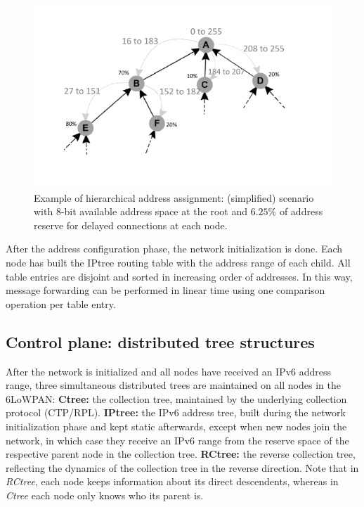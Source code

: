 \begin{figure}[ht]
    \centering
    \includegraphics[width=0.9\linewidth]{./Images/mhcl.pdf}
\caption{Example of hierarchical address assignment: (simplified)
scenario with 8-bit available address space at the root and $6.25\%$
of address reserve for delayed connections at each node.}
    \label{fig:mhcl}
\end{figure}

After the address configuration phase, the network initialization is done.
Each node has built the IPtree routing table with the address range of each
child. All table entries are disjoint and sorted in increasing order of
addresses. In this way, message forwarding can be performed in linear time using
one comparison operation per table entry.



\subsection{Control plane: distributed tree structures}

After the network is initialized and all nodes have received an IPv6
address range, three simultaneous distributed trees are maintained
on all nodes in the 6LoWPAN: \textbf{Ctree:} the collection tree, maintained by the underlying
  collection protocol (CTP/RPL).
	\textbf{IPtree:} the IPv6 address tree, built during the network
  initialization phase and kept static afterwards, except when new
  nodes join the network, in which case they receive an IPv6 range from the reserve space of the respective
parent node in the collection tree.
	\textbf{RCtree:} the reverse collection tree, reflecting the
  dynamics of the collection tree in the reverse direction. Note that in \textit{RCtree},
	each node keeps information about its direct descendents, whereas in \textit{Ctree} each
	node only knows who its parent is.

